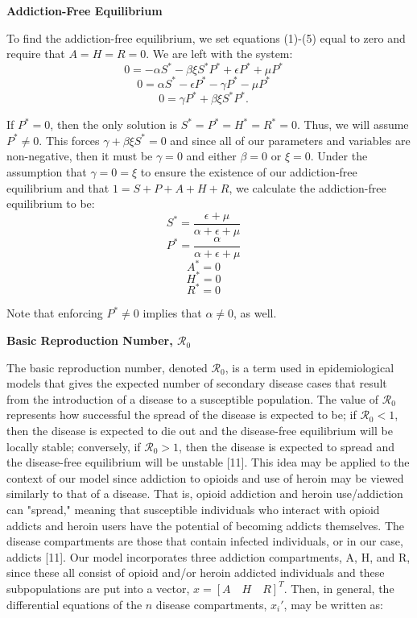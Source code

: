 \documentclass[12pt]{article}
\begin{document}
 
 
\textbf{Addiction-Free Equilibrium} 

To find the addiction-free equilibrium, we set equations (1)-(5) equal to zero and require that $A=H=R=0$. We are left with the system: \\
\[0=-\alpha S^* -\beta \xi S^* P^* + \epsilon P^* +\mu P^* \quad\]
\[0=\alpha S^* - \epsilon P^* -\gamma P^* - \mu P^* \quad\]
\[0=\gamma P^* + \beta \xi S^* P^*.   \quad\]



If $P^*=0$, then the only solution is $S^*=P^*=H^*=R^*=0$. Thus, we will assume $P^* \neq 0. $ This forces $\gamma + \beta \xi S^* =0$ and since all of our parameters and variables are non-negative, then it must be $\gamma=0$ and either $\beta=0$ or $\xi=0$. Under the assumption that $\gamma=0=\xi$ to ensure the existence of our addiction-free equilibrium and that $1=S+P+A+H+R$, we calculate the addiction-free equilibrium to be: \\

\[S^*=\frac{\epsilon + \mu}{\alpha + \epsilon +\mu}\quad\]
\[P^*=\frac{\alpha}{\alpha + \epsilon +\mu}\quad\]
\[A^*=0\quad\]
\[H^*=0\quad\]
\[R^*=0\quad\] 

Note that enforcing $P^* \neq 0$ implies that $\alpha \neq 0$, as well.

\textbf{Basic Reproduction Number, \textbf{$\mathscr{R}_0$}}

The basic reproduction number, denoted $\mathscr{R}_0$, is a term used in epidemiological models that gives the expected number of secondary disease cases that result from the introduction of a disease to a susceptible population. The value of $\mathscr{R}_0$ represents how successful the spread of the disease is expected to be; if $\mathscr{R}_0 < 1$, then the disease is expected to die out and the disease-free equilibrium will be locally stable; conversely, if $\mathscr{R}_0 >1$, then the disease is expected to spread and the disease-free equilibrium will be unstable [11]. This idea may be applied to the context of our model since addiction to opioids and use of heroin may be viewed similarly to that of a disease. That is, opioid addiction and heroin use/addiction can "spread," meaning that susceptible individuals who interact with opioid addicts and heroin users have the potential of becoming addicts themselves. The disease compartments are those that contain infected individuals, or in our case, addicts [11]. Our model incorporates three addiction compartments, A, H, and R, since these all consist of opioid and/or heroin addicted individuals and these subpopulations are put into a vector, $x= {[A\quad H\quad R]}^{T}$. Then, in general, the differential equations of the $n$ disease compartments, $x_i'$, may be written as: 
\end{document}
